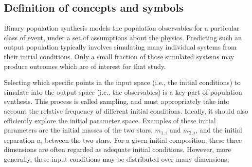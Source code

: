 \documentclass[a4paper,fleqn,usenatbib,useAMS,usedcolumn]{mnras}
\begin{document}
\subsection{Definition of concepts and symbols}
\label{sec:BPS}
%
Binary population synthesis models the population observables for a particular class of event, under a set of assumptions about the physics.  Predicting such an output population typically involves simulating many individual systems from their initial conditions.  Only a small fraction of those simulated systems may produce outcomes which are of interest for that study.  

Selecting which specific points in the input space (i.e., the initial conditions) to simulate into the output space (i.e., the observables) is a key part of population synthesis.  This process is called sampling, and must appropriately take into account the relative frequency of different initial conditions.  Ideally, it should also efficiently explore the initial parameter space.  Examples of these initial parameters are the initial masses of the two stars, $m_{1,i}$ and $m_{2,i}$, and the initial separation $a_i$ between the two stars.  For a given initial composition, these three dimensions are often regarded as adequate initial conditions.  However, more generally, these input conditions may be distributed over many dimensions.   
\end{document}
